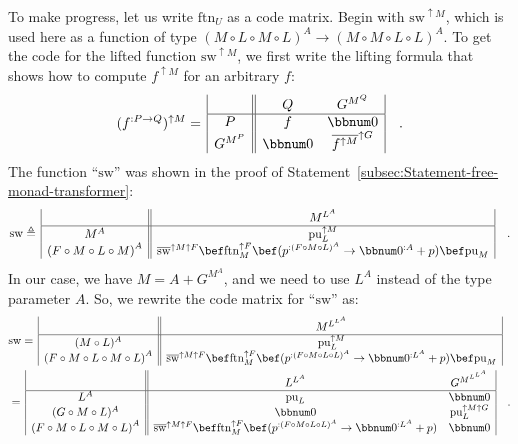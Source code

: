 To make progress, let us write $\text{ftn}_{U}$ as a code matrix.
Begin with $\text{sw}^{\uparrow M}$, which is used here as a function
of type $(M\circ L\circ M\circ L)^{A}\rightarrow(M\circ M\circ L\circ L)^{A}$.
To get the code for the lifted function $\text{sw}^{\uparrow M}$,
we first write the lifting formula that shows how to compute $f^{\uparrow M}$
for an arbitrary $f$:
\[
(f^{:P\rightarrow Q})^{\uparrow M}=\,\begin{array}{|c||cc|}
 & Q & G^{M^{Q}}\\
\hline P & f & \bbnum 0\\
G^{M^{P}} & \bbnum 0 & \overline{f^{\uparrow M}}^{\uparrow G}
\end{array}\quad.
\]
 The function \textsf{``}$\text{sw}$\textsf{''} was shown in the proof of Statement~\ref{subsec:Statement-free-monad-transformer}:
\[
\text{sw}\triangleq\,\begin{array}{|c||c|}
 & M^{L^{A}}\\
\hline M^{A} & \text{pu}_{L}^{\uparrow M}\\
\left(F\circ M\circ L\circ M\right)^{A} & \overline{\text{sw}}^{\uparrow M\uparrow F}\bef\text{ftn}_{M}^{\uparrow F}\bef(p^{:(F\circ M\circ L)^{A}}\rightarrow\bbnum 0^{:A}+p)\bef\text{pu}_{M}
\end{array}\quad.
\]
In our case, we have $M=A+G^{M^{A}}$, and we need to use $L^{A}$
instead of the type parameter $A$. So, we rewrite the code matrix
for \textsf{``}$\text{sw}$\textsf{''} as:
\begin{align*}
 & \text{sw}=\,\begin{array}{|c||c|}
 & M^{L^{L^{A}}}\\
\hline (M\circ L)^{A} & \text{pu}_{L}^{\uparrow M}\\
\left(F\circ M\circ L\circ M\circ L\right)^{A} & \overline{\text{sw}}^{\uparrow M\uparrow F}\bef\text{ftn}_{M}^{\uparrow F}\bef(p^{:(F\circ M\circ L\circ L)^{A}}\rightarrow\bbnum 0^{:L^{A}}+p)\bef\text{pu}_{M}
\end{array}\\
 & =\,\begin{array}{|c||cc|}
 & L^{L^{A}} & G^{M^{L^{L^{A}}}}\\
\hline L^{A} & \text{pu}_{L} & \bbnum 0\\
(G\circ M\circ L)^{A} & \bbnum 0 & \text{pu}_{L}^{\uparrow M\uparrow G}\\
\left(F\circ M\circ L\circ M\circ L\right)^{A} & \overline{\text{sw}}^{\uparrow M\uparrow F}\bef\text{ftn}_{M}^{\uparrow F}\bef(p^{:(F\circ M\circ L\circ L)^{A}}\rightarrow\bbnum 0^{:L^{A}}+p) & \bbnum 0
\end{array}\quad.
\end{align*}

